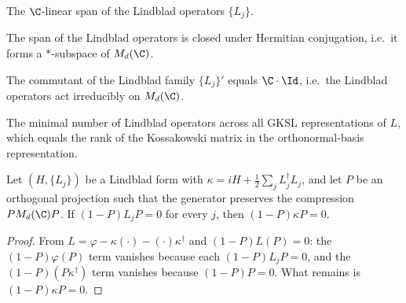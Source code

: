 \begin{definition}\label{def:lindblad_span}
    \leanok
    The $\C$-linear span of the Lindblad operators $\{L_j\}$.
\end{definition}

\begin{definition}\label{def:is_lindblad_span_hermitian_closed}
    \leanok
    The span of the Lindblad operators is closed under Hermitian conjugation,
    i.e.\ it forms a $*$-subspace of $M_d(\C)$.
\end{definition}

\begin{definition}\label{def:has_lindblad_span_trivial_commutant}
    \leanok
    The commutant of the Lindblad family $\{L_j\}'$ equals $\C \cdot \Id$,
    i.e.\ the Lindblad operators act irreducibly on $M_d(\C)$.
\end{definition}

\begin{definition}\label{def:kossakowski_rank}
    \leanok
    The minimal number of Lindblad operators across all GKSL representations
    of $L$, which equals the rank of the Kossakowski matrix in the
    orthonormal-basis representation.
\end{definition}

\begin{theorem}%
    \label{thm:kappa_block_generator_compression}
    \leanok
    Let $(H, \{L_j\})$ be a Lindblad form with
    $\kappa = iH + \tfrac{1}{2}\sum_j L_j^\dagger L_j$, and let $P$ be an
    orthogonal projection such that the generator preserves the compression
    $P M_d(\C) P$.
    If $(1-P) L_j P = 0$ for every $j$, then $(1-P) \kappa P = 0$.
\end{theorem}
\begin{proof}\leanok
    From $L = \varphi - \kappa(\cdot) - (\cdot)\kappa^\dagger$ and
    $(1-P)L(P) = 0$: the $(1-P)\varphi(P)$ term vanishes because each
    $(1-P)L_j P = 0$, and the $(1-P)(P\kappa^\dagger)$ term vanishes
    because $(1-P)P = 0$. What remains is $(1-P)\kappa P = 0$.
\end{proof}

